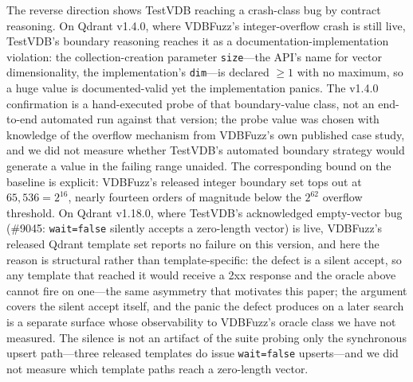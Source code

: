 \documentclass[acmsmall,screen,review,anonymous]{acmart}
\newcommand{\system}{TestVDB}
\begin{document}
The reverse direction shows \system{} reaching a crash-class bug by contract reasoning. On Qdrant v1.4.0, where VDBFuzz's integer-overflow crash is still live, \system{}'s boundary reasoning reaches it as a documentation-implementation violation: the collection-creation parameter \texttt{size}---the API's name for vector dimensionality, the implementation's \texttt{dim}---is declared $\geq 1$ with no maximum, so a huge value is documented-valid yet the implementation panics. The v1.4.0 confirmation is a hand-executed probe of that boundary-value class, not an end-to-end automated run against that version; the probe value was chosen with knowledge of the overflow mechanism from VDBFuzz's own published case study, and we did not measure whether \system{}'s automated boundary strategy would generate a value in the failing range unaided. The corresponding bound on the baseline is explicit: VDBFuzz's released integer boundary set tops out at $65{,}536 = 2^{16}$, nearly fourteen orders of magnitude below the $2^{62}$ overflow threshold. On Qdrant v1.18.0, where \system{}'s acknowledged empty-vector bug (\#9045: \texttt{wait=false} silently accepts a zero-length vector) is live, VDBFuzz's released Qdrant template set reports no failure on this version, and here the reason is structural rather than template-specific: the defect is a silent accept, so any template that reached it would receive a 2xx response and the oracle above cannot fire on one---the same asymmetry that motivates this paper; the argument covers the silent accept itself, and the panic the defect produces on a later search is a separate surface whose observability to VDBFuzz's oracle class we have not measured. The silence is not an artifact of the suite probing only the synchronous upsert path---three released templates do issue \texttt{wait=false} upserts---and we did not measure which template paths reach a zero-length vector.
\end{document}
